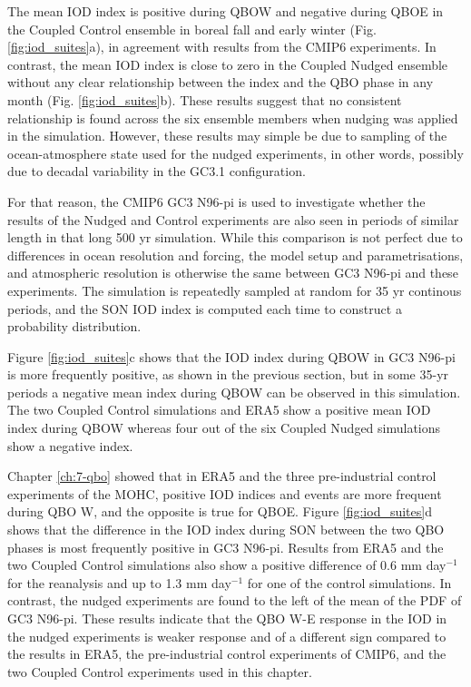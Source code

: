 The mean IOD index is positive during QBOW and negative during QBOE in the Coupled Control ensemble in boreal fall and early winter (Fig. \ref{fig:iod_suites}a), in agreement with results from the CMIP6 experiments. In contrast, the mean IOD index is close to zero in the Coupled Nudged ensemble without any clear relationship between the index and the QBO phase in any month (Fig. \ref{fig:iod_suites}b). 
These results suggest that no consistent relationship is found across the six ensemble members when nudging was applied in the simulation. 
However, these results may simple be due to sampling of the ocean-atmosphere state used for the nudged experiments, in other words, possibly due to decadal variability in the GC3.1 configuration.

For that reason, the CMIP6 GC3 N96-pi is used to investigate whether the results of the Nudged and Control experiments are also seen in periods of similar length in that long 500 yr simulation. While this comparison is not perfect due to differences in ocean resolution and forcing, the model setup and parametrisations, and atmospheric resolution is otherwise the same between GC3 N96-pi and these experiments. 
The simulation is repeatedly sampled at random for 35 yr continous periods, and the SON IOD index is computed each time to construct a probability distribution.  

Figure \ref{fig:iod_suites}c shows that the IOD index during QBOW in GC3 N96-pi is more frequently positive, as shown in the previous section, but in some 35-yr periods a negative mean index during QBOW can be observed in this simulation. The two Coupled Control simulations and ERA5 show a positive mean IOD index during QBOW whereas four out of the six Coupled Nudged simulations show a negative index. 

Chapter \ref{ch:7-qbo} showed that in ERA5 and the three pre-industrial control experiments of the MOHC, positive IOD indices and events are more frequent during QBO W, and the opposite is true for QBOE. Figure \ref{fig:iod_suites}d  shows that the difference in the IOD index during SON between the two QBO phases is most frequently positive in GC3 N96-pi.  
Results from ERA5 and the two Coupled Control simulations also show a positive difference of 0.6 mm day$^{-1}$ for the reanalysis and up to 1.3 mm day$^{-1}$ for one of the control simulations. 
In contrast, the nudged experiments are found to the left of the mean of the PDF of GC3 N96-pi.
These results indicate that the QBO W-E response in the IOD in the nudged experiments is  weaker response and of a different sign compared to the results in ERA5, the pre-industrial control experiments of CMIP6, and the two Coupled Control experiments used in this chapter. 

